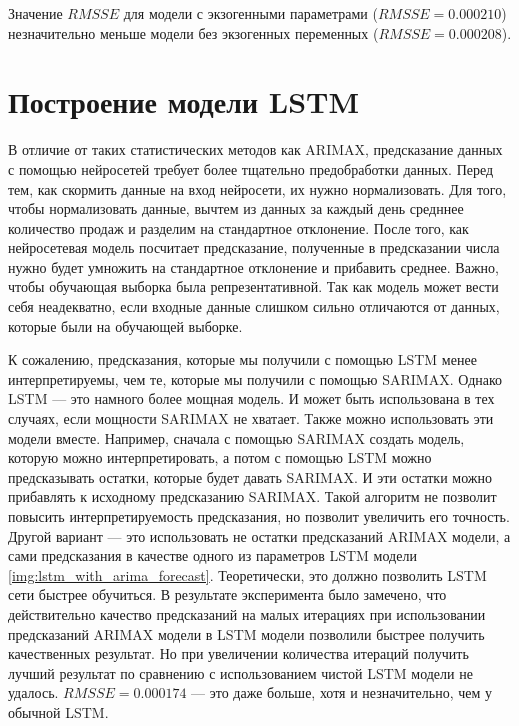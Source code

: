 Значение $ RMSSE $ для модели с экзогенными параметрами ($ RMSSE = 0.000210 $) незначительно меньше
модели без экзогенных переменных ($ RMSSE = 0.000208 $).


\section{Построение модели LSTM}

В отличие от таких статистических методов как ARIMAX, предсказание данных
с помощью нейросетей требует более тщательно предобработки данных.
Перед тем, как скормить данные на вход нейросети, их нужно нормализовать.
Для того, чтобы нормализовать данные, вычтем из данных за каждый день средннее
количество продаж и разделим на стандартное отклонение. После того, как
нейросетевая модель посчитает предсказание, полученные в предсказании
числа нужно будет умножить на стандартное отклонение и прибавить среднее.
Важно, чтобы обучающая выборка была репрезентативной. Так как модель
может вести себя неадекватно, если входные данные слишком сильно отличаются
от данных, которые были на обучающей выборке.

К сожалению, предсказания, которые мы получили с помощью  LSTM менее интерпретируемы,
чем те, которые мы получили с помощью SARIMAX. Однако LSTM --- это намного более
мощная модель. И может быть использована в тех случаях, если мощности SARIMAX не хватает.
Также можно использовать эти модели вместе. Например, сначала с помощью SARIMAX создать
модель, которую можно интерпретировать, а потом с помощью LSTM можно предсказывать остатки, которые будет
давать SARIMAX. И эти остатки можно прибавлять к исходному предсказанию SARIMAX. Такой алгоритм
не позволит повысить интерпретируемость предсказания, но позволит увеличить его точность.
Другой вариант --- это использовать не остатки предсказаний ARIMAX модели, а
сами предсказания в качестве одного из параметров LSTM модели \ref{img:lstm_with_arima_forecast}.
Теоретически, это должно позволить LSTM сети быстрее обучиться.
В результате эксперимента было замечено, что действительно качество предсказаний
на малых итерациях при использовании предсказаний ARIMAX модели в LSTM модели
позволили быстрее получить качественных результат. Но при увеличении количества итераций
получить лучший результат по сравнению с использованием чистой LSTM модели не удалось.
$ RMSSE = 0.000174 $ --- это даже больше, хотя и незначительно, чем у обычной LSTM.

